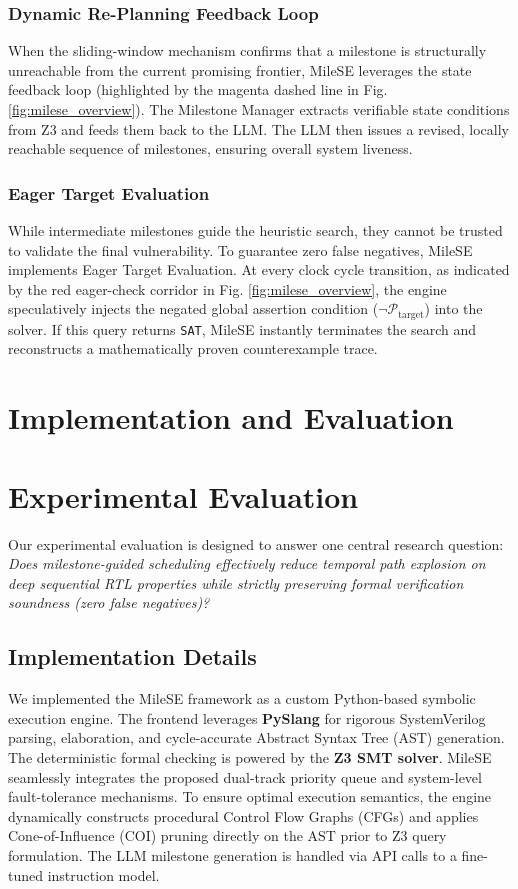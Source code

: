 \documentclass[conference]{IEEEtran}
\begin{document}
\subsubsection{Dynamic Re-Planning Feedback Loop}
When the sliding-window mechanism confirms that a milestone is structurally unreachable from the current promising frontier, MileSE leverages the state feedback loop (highlighted by the magenta dashed line in Fig. \ref{fig:milese_overview}). The Milestone Manager extracts verifiable state conditions from Z3 and feeds them back to the LLM. The LLM then issues a revised, locally reachable sequence of milestones, ensuring overall system liveness.

\subsubsection{Eager Target Evaluation}
While intermediate milestones guide the heuristic search, they cannot be trusted to validate the final vulnerability. To guarantee zero false negatives, MileSE implements Eager Target Evaluation. At every clock cycle transition, as indicated by the red eager-check corridor in Fig. \ref{fig:milese_overview}, the engine speculatively injects the negated global assertion condition ($\neg \mathcal{P}_{\text{target}}$) into the solver. If this query returns \texttt{SAT}, MileSE instantly terminates the search and reconstructs a mathematically proven counterexample trace.

\section{Implementation and Evaluation}
\label{sec:evaluation}

\section{Experimental Evaluation}
\label{sec:evaluation}

Our experimental evaluation is designed to answer one central research question: \textit{Does milestone-guided scheduling effectively reduce temporal path explosion on deep sequential RTL properties while strictly preserving formal verification soundness (zero false negatives)?} 

\subsection{Implementation Details}
We implemented the MileSE framework as a custom Python-based symbolic execution engine. The frontend leverages \textbf{PySlang} for rigorous SystemVerilog parsing, elaboration, and cycle-accurate Abstract Syntax Tree (AST) generation. The deterministic formal checking is powered by the \textbf{Z3 SMT solver}. MileSE seamlessly integrates the proposed dual-track priority queue and system-level fault-tolerance mechanisms. To ensure optimal execution semantics, the engine dynamically constructs procedural Control Flow Graphs (CFGs) and applies Cone-of-Influence (COI) pruning directly on the AST prior to Z3 query formulation. The LLM milestone generation is handled via API calls to a fine-tuned instruction model.
\end{document}
